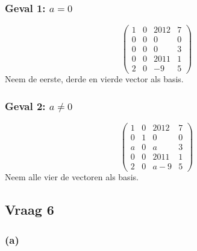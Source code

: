 \documentclass[lineaire_algebra_oplossingen.tex]{subfiles}
\begin{document}
\subsubsection*{Geval 1: $a=0$}
\[
\begin{pmatrix}
1 & 0 & 2012 & 7\\
0 & 0 & 0 & 0\\
0 & 0 & 0 & 3\\
0 & 0 & 2011 & 1\\
2 & 0 & -9 & 5
\end{pmatrix}
\]
Neem de eerste, derde en vierde vector als basis.

\subsubsection*{Geval 2: $a\neq0$}
\[
\begin{pmatrix}
1 & 0 & 2012 & 7\\
0 & 1 & 0 & 0\\
a & 0 & a & 3\\
0 & 0 & 2011 & 1\\
2 & 0 & a-9 & 5
\end{pmatrix}
\]
Neem alle vier de vectoren als basis.

\subsection{Vraag 6}
\subsubsection*{(a)}
\end{document}
